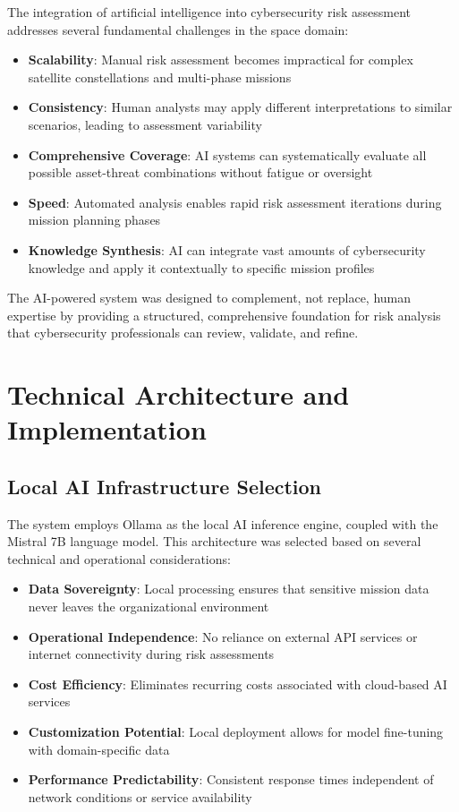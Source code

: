 \documentclass[binding=0.6cm]{sapthesis}
\begin{document}
The integration of artificial intelligence into cybersecurity risk assessment addresses several fundamental challenges in the space domain:

\begin{itemize}
    \item \textbf{Scalability}: Manual risk assessment becomes impractical for complex satellite constellations and multi-phase missions
    \item \textbf{Consistency}: Human analysts may apply different interpretations to similar scenarios, leading to assessment variability
    \item \textbf{Comprehensive Coverage}: AI systems can systematically evaluate all possible asset-threat combinations without fatigue or oversight
    \item \textbf{Speed}: Automated analysis enables rapid risk assessment iterations during mission planning phases
    \item \textbf{Knowledge Synthesis}: AI can integrate vast amounts of cybersecurity knowledge and apply it contextually to specific mission profiles
\end{itemize}

The AI-powered system was designed to complement, not replace, human expertise by providing a structured, comprehensive foundation for risk analysis that cybersecurity professionals can review, validate, and refine.

\section{Technical Architecture and Implementation}

\subsection{Local AI Infrastructure Selection}

The system employs Ollama as the local AI inference engine, coupled with the Mistral 7B language model. This architecture was selected based on several technical and operational considerations:

\begin{itemize}
    \item \textbf{Data Sovereignty}: Local processing ensures that sensitive mission data never leaves the organizational environment
    \item \textbf{Operational Independence}: No reliance on external API services or internet connectivity during risk assessments
    \item \textbf{Cost Efficiency}: Eliminates recurring costs associated with cloud-based AI services
    \item \textbf{Customization Potential}: Local deployment allows for model fine-tuning with domain-specific data
    \item \textbf{Performance Predictability}: Consistent response times independent of network conditions or service availability
\end{itemize}
\end{document}
